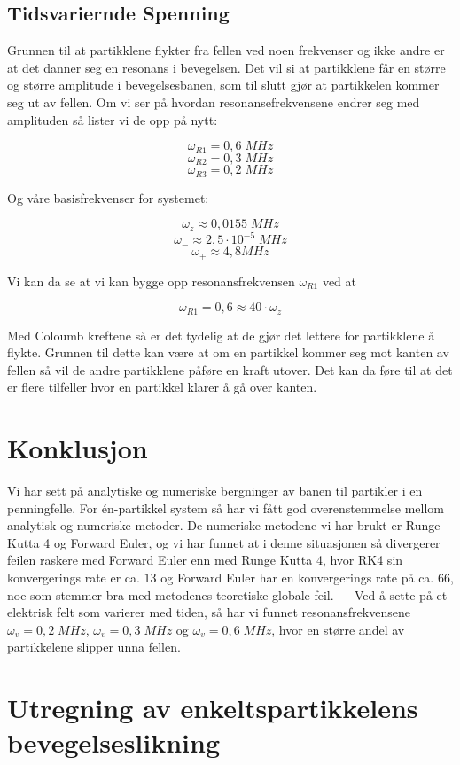 \documentclass[reprint,english,notitlepage, nofootinbib]{revtex4-1}  %
\begin{document}
\subsection*{Tidsvariernde Spenning}

Grunnen til at partikklene flykter fra fellen ved noen frekvenser og ikke andre er at det danner seg en resonans i bevegelsen. Det vil si at partikklene får en større og større amplitude i bevegelsesbanen, som til slutt gjør at partikkelen kommer seg ut av fellen. Om vi ser på hvordan resonansefrekvensene endrer seg med amplituden så lister vi de opp på nytt:

$$\omega_{R1} = 0,6 \; MHz$$
$$\omega_{R2} = 0,3 \; MHz $$
$$\omega_{R3} = 0,2 \; MHz $$

Og våre basisfrekvenser for systemet:

$$\omega_z \approx 0,0155 \; MHz$$
$$\omega_- \approx 2,5 \cdot 10^{-5} \; MHz$$
$$\omega_+ \approx 4,8 MHz$$

Vi kan da se at vi kan bygge opp resonansfrekvensen $\omega_{R1}$ ved at

$$\omega_{R1} = 0,6 \approx 40 \cdot \omega_z$$

Med Coloumb kreftene så er det tydelig at de gjør det lettere for partikklene å flykte. Grunnen til dette kan være at om en partikkel kommer seg mot kanten av fellen så vil de andre partikklene påføre en kraft utover. Det kan da føre til at det er flere tilfeller hvor en partikkel klarer å gå over kanten. 

\section{Konklusjon}

Vi har sett på analytiske og numeriske bergninger av banen til partikler i en penningfelle. For én-partikkel system så har vi fått god overenstemmelse mellom analytisk og numeriske metoder. De numeriske metodene vi har brukt er Runge Kutta 4 og Forward Euler, og vi har funnet at i denne situasjonen så divergerer feilen raskere med Forward Euler enn med Runge Kutta 4, hvor RK4 sin konvergerings rate er ca. $13$ og Forward Euler har en konvergerings rate på ca. $66$, noe som stemmer bra med metodenes teoretiske globale feil. --- Ved å sette på et elektrisk felt som varierer med tiden, så har vi funnet resonansfrekvensene $\omega_v = 0,2 \; MHz$, $\omega_v = 0,3 \; MHz$ og $\omega_v =  0,6 \; MHz$, hvor en større andel av partikkelene slipper unna fellen. 

\newpage
\appendix
\section{Utregning av enkeltspartikkelens bevegelseslikning}\label{ap:moteq}
\end{document}

